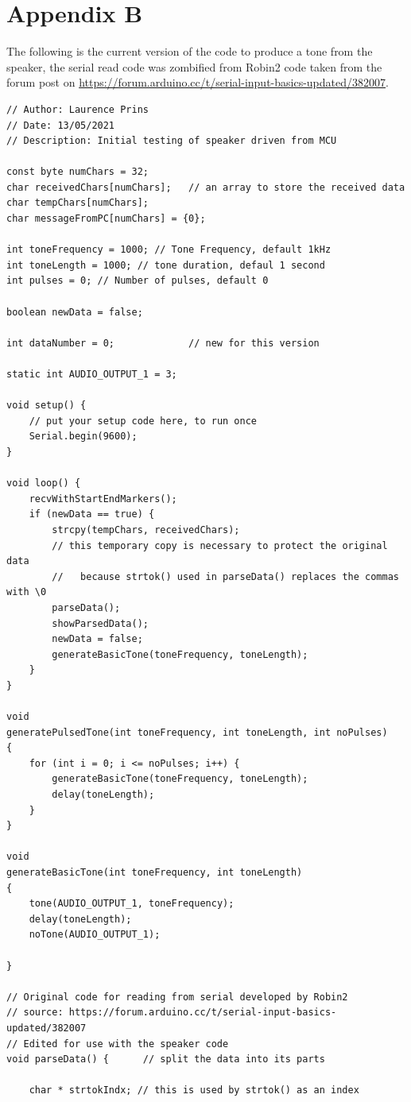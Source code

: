 \documentclass[12pt, a4paper]{article}
\begin{document}
\pagebreak
\section*{Appendix B}
The following is the current version of the code to produce a tone from the speaker, the serial read code was zombified from Robin2 code taken from the forum post on \url{https://forum.arduino.cc/t/serial-input-basics-updated/382007}.

\begin{lstlisting}
// Author: Laurence Prins
// Date: 13/05/2021
// Description: Initial testing of speaker driven from MCU

const byte numChars = 32;
char receivedChars[numChars];   // an array to store the received data
char tempChars[numChars]; 
char messageFromPC[numChars] = {0};

int toneFrequency = 1000; // Tone Frequency, default 1kHz
int toneLength = 1000; // tone duration, defaul 1 second
int pulses = 0; // Number of pulses, default 0

boolean newData = false;

int dataNumber = 0;             // new for this version

static int AUDIO_OUTPUT_1 = 3;

void setup() {
	// put your setup code here, to run once
	Serial.begin(9600);
}

void loop() {
	recvWithStartEndMarkers();
	if (newData == true) {
		strcpy(tempChars, receivedChars);
		// this temporary copy is necessary to protect the original data
		//   because strtok() used in parseData() replaces the commas with \0
		parseData();
		showParsedData();
		newData = false;
		generateBasicTone(toneFrequency, toneLength);
	}
}

void 
generatePulsedTone(int toneFrequency, int toneLength, int noPulses)
{
	for (int i = 0; i <= noPulses; i++) {
		generateBasicTone(toneFrequency, toneLength);
		delay(toneLength);
	}
}

void 
generateBasicTone(int toneFrequency, int toneLength) 
{
	tone(AUDIO_OUTPUT_1, toneFrequency);
	delay(toneLength);
	noTone(AUDIO_OUTPUT_1);
	
}

// Original code for reading from serial developed by Robin2
// source: https://forum.arduino.cc/t/serial-input-basics-updated/382007 
// Edited for use with the speaker code
void parseData() {      // split the data into its parts
	
	char * strtokIndx; // this is used by strtok() as an index
	

\end{lstlisting}
\end{document}

